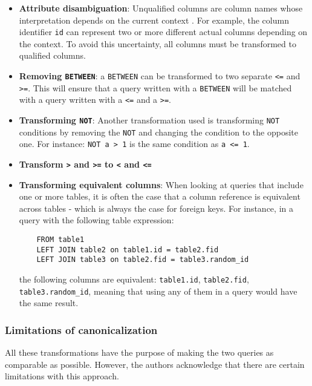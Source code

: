 \begin{itemize}
    \item \textbf{Attribute disambiguation}: Unqualified columns are column names whose interpretation depends on the current context \citep{mysql:documentation}. For example, the column identifier \texttt{id} can represent two or more different actual columns depending on the context. To avoid this uncertainty, all columns must be transformed to qualified columns.
    \item \textbf{Removing \texttt{BETWEEN}}: a \texttt{BETWEEN} can be transformed to two separate \texttt{<=} and \texttt{>=}. This will ensure that a query written with a \texttt{BETWEEN} will be matched with a query written with a \texttt{<=} and a \texttt{>=}.
    \item \textbf{Transforming \texttt{NOT}}: Another transformation used is transforming \texttt{NOT} conditions by removing the \texttt{NOT} and changing the condition to the opposite one. For instance: \texttt{NOT a > 1} is the same condition as \texttt{a <= 1}.
    \item \textbf{Transform \texttt{>} and \texttt{>=} to \texttt{<} and \texttt{<=}}
    \item \textbf{Transforming equivalent columns}: When looking at queries that include one or more tables, it is often the case that a column reference is equivalent across tables - which is always the case for foreign keys. For instance, in a query with the following table expression: \begin{verbatim}
    FROM table1
    LEFT JOIN table2 on table1.id = table2.fid
    LEFT JOIN table3 on table2.fid = table3.random_id
    \end{verbatim}
    the following columns are equivalent: \texttt{table1.id}, \texttt{table2.fid}, \texttt{table3.random_id}, meaning that using any of them in a query would have the same result.
\end{itemize}

\subsubsection{Limitations of canonicalization} \label{ch:lit:sec:can:subsec:limit}

All these transformations have the purpose of making the two queries as comparable as possible. However, the authors acknowledge that there are certain limitations with this approach.

